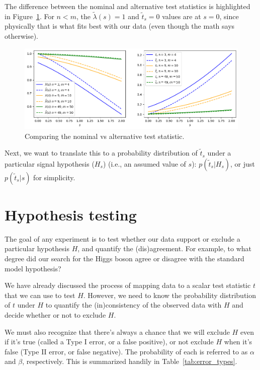 The difference between the nominal and alternative test statistics is highlighted in Figure~\ref{fig:alt_ts}.
For $n < m$, the $\tilde{\lambda}(s) = 1$ and $\tilde{t}_s = 0$ values are at $s = 0$, since physically that is what fits best with our data (even though the math says otherwise).

\begin{figure}[htb]
\centering
\includegraphics[width=\textwidth]{figures/01-intro/4.png}
\captionsetup{justification=centering}
\caption{Comparing the nominal vs alternative test statistic.}
\label{fig:alt_ts}
\end{figure}

Next, we want to translate this to a probability distribution of $\tilde{t}_s$ under a particular signal hypothesis ($H_s$) (i.e., an assumed value of $s$): $p(\tilde{t}_s|H_s)$, or just $p(\tilde{t}_s|s)$ for simplicity.


\chapter{Hypothesis testing}
\label{sec:hypothesis_testing}

The goal of any experiment is to test whether our data support or exclude a particular hypothesis $H$, and quantify the (dis)agreement. For example, to what degree did our search for the Higgs boson agree or disagree with the standard model hypothesis?

We have already discussed the process of mapping data to a scalar test statistic $t$ that we can use to test $H$.
However, we need to know the probability distribution of $t$ under $H$ to quantify the (in)consistency of the observed data with $H$ and decide whether or not to exclude $H$.

We must also recognize that there's always a chance that we will exclude $H$ even if it's true (called a Type I error, or a false positive), or not exclude $H$ when it's false (Type II error, or false negative).
The probability of each is referred to as $\alpha$ and $\beta$, respectively.
This is summarized handily in Table~\ref{tab:error_types}.

